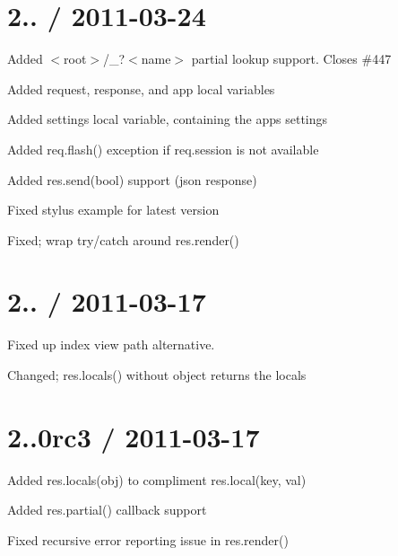 {\ttfamily \section*{2.. / 2011-\/03-\/24 }}

{\ttfamily }

{\ttfamily 
\begin{DoxyItemize}
\item Added {\ttfamily $<$root$>$/\+\_\+?$<$name$>$} partial lookup support. Closes \#447
\item Added {\ttfamily request}, {\ttfamily response}, and {\ttfamily app} local variables
\item Added {\ttfamily settings} local variable, containing the app\textquotesingle{}s settings
\item Added {\ttfamily req.\+flash()} exception if {\ttfamily req.\+session} is not available
\item Added {\ttfamily res.\+send(bool)} support (json response)
\item Fixed stylus example for latest version
\item Fixed; wrap try/catch around {\ttfamily res.\+render()}
\end{DoxyItemize}}

{\ttfamily \section*{2.. / 2011-\/03-\/17 }}

{\ttfamily }

{\ttfamily 
\begin{DoxyItemize}
\item Fixed up index view path alternative.
\item Changed; {\ttfamily res.\+locals()} without object returns the locals
\end{DoxyItemize}}

{\ttfamily \section*{2..\+0rc3 / 2011-\/03-\/17 }}

{\ttfamily }

{\ttfamily 
\begin{DoxyItemize}
\item Added {\ttfamily res.\+locals(obj)} to compliment {\ttfamily res.\+local(key, val)}
\item Added {\ttfamily res.\+partial()} callback support
\item Fixed recursive error reporting issue in {\ttfamily res.\+render()}
\end{DoxyItemize}}

